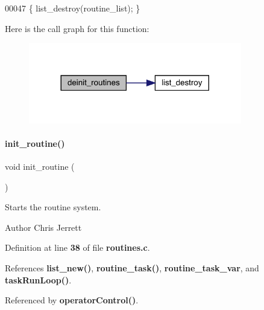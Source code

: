 \begin{DoxyCode}
00047 \{ list_destroy(routine_list); \}
\end{DoxyCode}
Here is the call graph for this function\+:\nopagebreak
\begin{figure}[H]
\begin{center}
\leavevmode
\includegraphics[width=264pt]{routines_8h_ad908adbc884189372f72f882ec62d71d_cgraph}
\end{center}
\end{figure}
\mbox{\label{routines_8h_ab873e24fcc59a2bf7844618b664a5d26}} 
\paragraph{init\+\_\+routine()}
{\footnotesize\ttfamily void init\+\_\+routine (\begin{DoxyParamCaption}{ }\end{DoxyParamCaption})}



Starts the routine system. 

\begin{DoxyAuthor}{Author}
Chris Jerrett 
\end{DoxyAuthor}


Definition at line \textbf{ 38} of file \textbf{ routines.\+c}.



References \textbf{ list\+\_\+new()}, \textbf{ routine\+\_\+task()}, \textbf{ routine\+\_\+task\+\_\+var}, and \textbf{ task\+Run\+Loop()}.



Referenced by \textbf{ operator\+Control()}.


